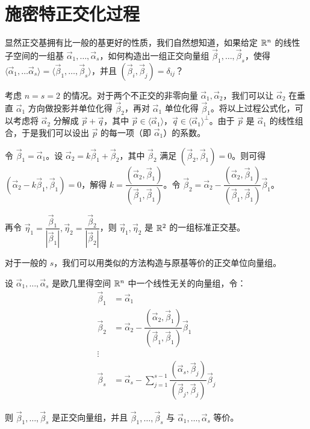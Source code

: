 
\section{施密特正交化过程}

显然正交基拥有比一般的基更好的性质，我们自然想知道，如果给定 $\mathbb R^n$ 的线性子空间的一组基 $\vec \alpha_1, \ldots, \vec \alpha_s$，如何构造出一组正交向量组 $\vec \beta_1, \ldots, \vec \beta_s$，使得 $\langle \vec \alpha_1, \ldots \vec \alpha_s \rangle = \langle \vec \beta_1, \ldots, \vec \beta_s \rangle$，并且 $(\vec \beta_i, \vec \beta_j) = \delta_{ij}$？

考虑 $n = s = 2$ 的情况。对于两个不正交的非零向量 $\vec \alpha_1, \vec \alpha_2$，我们可以让 $\vec \alpha_2$ 在垂直 $\vec \alpha_1$ 方向做投影并单位化得 $\vec \beta_2$，再对 $\vec \alpha_1$ 单位化得 $\vec \beta_1$。将以上过程公式化，可以考虑将 $\vec \alpha_2$ 分解成 $\vec p + \vec q$，其中 $\vec p \in \langle \vec \alpha_1 \rangle$，$\vec q \in \langle \vec \alpha_1 \rangle^\perp$。由于 $\vec p$ 是 $\vec \alpha_1$ 的线性组合，于是我们可以设出 $\vec p$ 的每一项（即 $\vec \alpha_1$）的系数。

\begin{solve}
	令 $\vec \beta_1 = \vec \alpha_1$。设 $\vec \alpha_2 = k \vec \beta_1 + \vec \beta_2$，其中 $\vec \beta_2$ 满足 $(\vec \beta_2, \vec \beta_1) = 0$。则可得 $(\vec \alpha_2 - k \vec \beta_1, \vec \beta_1) = 0$，解得 $k = \dfrac{(\vec \alpha_2, \vec \beta_1)}{(\vec \beta_1, \vec \beta_1)}$。令 $\vec \beta_2 = \vec \alpha_2 - \dfrac{(\vec \alpha_2, \vec \beta_1)}{(\vec \beta_1, \vec \beta_1)} \vec \beta_1$。

	再令 $\vec \eta_1 = \dfrac{\vec \beta_1}{|\vec \beta_1|}, \vec \eta_2 = \dfrac{\vec \beta_2}{|\vec \beta_2|}$，则 $\vec \eta_1, \vec \eta_2$ 是 $\mathbb R^2$ 的一组标准正交基。
\end{solve}

对于一般的 $s$，我们可以用类似的方法构造与原基等价的正交单位向量组。

\begin{theorem}[施密特正交化过程]
	设 $\vec \alpha_1, \ldots, \vec \alpha_s$ 是欧几里得空间 $\mathbb R^n$ 中一个线性无关的向量组，令：
	$$
	\begin{aligned}
		\vec \beta_1 &= \vec \alpha_1
		\\
		\vec \beta_2 &= \vec \alpha_2 - \dfrac{(\vec \alpha_2, \vec \beta_1)}{(\vec \beta_1, \vec \beta_1)} \vec \beta_1
		\\
		\vdots
		\\
		\vec \beta_s &= \vec \alpha_s - \sum\limits_{j = 1}^{s - 1} \dfrac{(\vec \alpha_s, \vec \beta_j)}{(\vec \beta_j, \vec \beta_j)} \vec \beta_j
	\end{aligned}
	$$

	则 $\vec \beta_1, \ldots, \vec \beta_s$ 是正交向量组，并且 $\vec \beta_1, \ldots, \vec \beta_s$ 与 $\vec \alpha_1, \ldots, \vec \alpha_s$ 等价。
\end{theorem}

